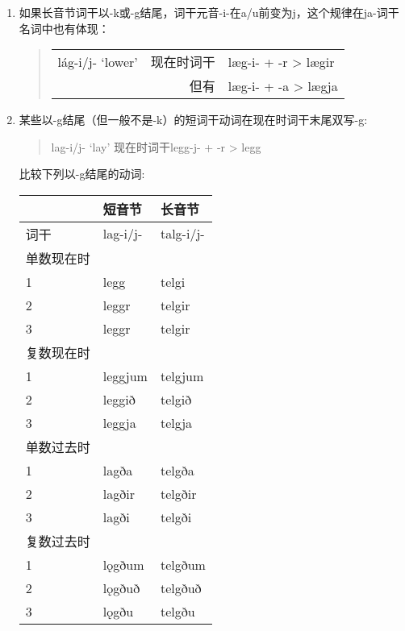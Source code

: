 \begin{enumerate}
    \item
          如果长音节词干以-k或-g结尾，词干元音-i-在a/u前变为j，这个规律在ja-词干名词中也有体现：

          \begin{quote}
              \begin{tabular}{lrl}
                  lág-i/j- `lower‌' & 现在时词干 & læg-i- + -r > lægir \\
                                   & 但有       & læg-i- + -a > lægja
              \end{tabular}

          \end{quote}
    \item
          某些以-g结尾（但一般不是-k）的短词干动词在现在时词干末尾双写-g:

          \begin{quote}lag-i/j- `lay‌' 现在时词干legg-j- + -r > legg\end{quote}

          比较下列以-g结尾的动词:

          \begin{longtable}{lll}
              \toprule
                         & 短音节   & 长音节    \\
              \midrule
              \endhead
              \bottomrule
              \endfoot
              词干       & lag-i/j- & talg-i/j- \\
              单数现在时 &          &           \\
              1          & legg     & telgi     \\
              2          & leggr    & telgir    \\
              3          & leggr    & telgir    \\
              复数现在时 &          &           \\
              1          & leggjum  & telgjum   \\
              2          & leggið   & telgið    \\
              3          & leggja   & telgja    \\
              单数过去时 &          &           \\
              1          & lagða    & telgða    \\
              2          & lagðir   & telgðir   \\
              3          & lagði    & telgði    \\
              复数过去时 &          &           \\
              1          & lǫgðum   & telgðum   \\
              2          & lǫgðuð   & telgðuð   \\
              3          & lǫgðu    & telgðu    \\
          \end{longtable}


\end{enumerate}
